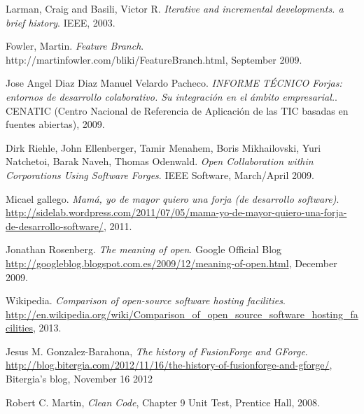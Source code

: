 \documentclass[a4paper, 12pt]{book}
\begin{document}
\begin{thebibliography}{25}


 Larman, Craig and Basili, Victor R. \textit{Iterative and incremental developments. a brief history}. IEEE, 2003.

 Fowler, Martin. \textit{Feature Branch}. http://martinfowler.com/bliki/FeatureBranch.html, September 2009.


 Jose Angel Diaz Diaz Manuel Velardo Pacheco. \textit{INFORME TÉCNICO Forjas: entornos de desarrollo colaborativo. Su integración en el ámbito empresarial.}. CENATIC (Centro Nacional de Referencia de Aplicación de las TIC basadas en fuentes abiertas), 2009.

 Dirk Riehle, John Ellenberger, Tamir Menahem, Boris Mikhailovski, Yuri Natchetoi, Barak Naveh, Thomas Odenwald. \textit{Open Collaboration within Corporations Using Software Forges}. IEEE Software, March/April 2009.

 Micael gallego. \textit{Mamá, yo de mayor quiero una forja (de desarrollo software)}. \url{http://sidelab.wordpress.com/2011/07/05/mama-yo-de-mayor-quiero-una-forja-de-desarrollo-software/}, 2011.

 Jonathan Rosenberg. \textit{The meaning of open}. Google Official Blog \url{http://googleblog.blogspot.com.es/2009/12/meaning-of-open.html}, December 2009.

 Wikipedia. \textit{Comparison of open-source software hosting facilities}. \url{http://en.wikipedia.org/wiki/Comparison_of_open_source_software_hosting_facilities}, 2013.

 Jesus M. Gonzalez-Barahona, \textit{The history of FusionForge and GForge}. \url{http://blog.bitergia.com/2012/11/16/the-history-of-fusionforge-and-gforge/}, Bitergia's blog, November 16 2012

 Robert C. Martin, \textit{Clean Code}, Chapter 9 Unit Test, Prentice Hall, 2008.

\end{thebibliography}
\end{document}
